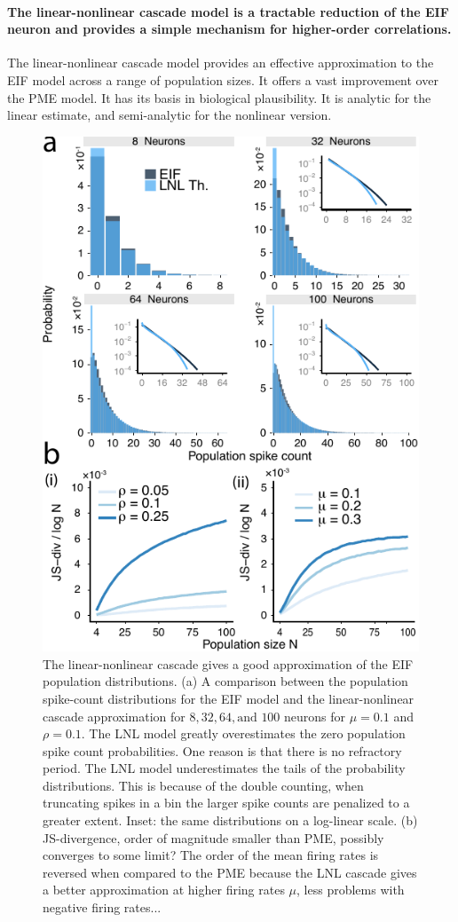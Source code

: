 \documentclass[%
 reprint,
 amsmath,amssymb,
 aps,
floatfix,
]{revtex4-1}
\begin{document}
\paragraph*{The linear-nonlinear cascade model is a tractable reduction of the EIF neuron and provides a simple mechanism for higher-order correlations.}
The linear-nonlinear cascade model provides an effective approximation to the EIF model across a range of population sizes. It offers a vast improvement over the PME model. It has its basis in biological plausibility. It is analytic for the linear estimate, and semi-analytic for the nonlinear version. 
\begin{figure}[h]
\includegraphics{../R/fig_3/fig_3a_test.pdf}
\caption{\label{fig:eiffilter} The linear-nonlinear cascade gives a good approximation of the EIF population distributions. (a) A comparison between the population spike-count distributions for the EIF model and the linear-nonlinear cascade approximation for $8, 32, 64, \text{and } 100$ neurons for $\mu = 0.1$ and $\rho = 0.1$. The LNL model greatly overestimates the zero population spike count probabilities. One reason is that there is no refractory period. The LNL model underestimates the tails of the probability distributions. This is because of the double counting, when truncating spikes in a bin the larger spike counts are penalized to a greater extent. Inset: the same distributions on a log-linear scale. (b) JS-divergence, order of magnitude smaller than PME, possibly converges to some limit? The order of the mean firing rates is reversed when compared to the PME because the LNL cascade gives a better approximation at higher firing rates $\mu$, less problems with negative firing rates...}

\end{figure}
\end{document}
